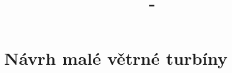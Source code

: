 \documentclass [a4paper,11pt,oneside,notitlepage,openright]{report} %
\author{\Autor}
\title{\Jmeno - \NazevCJ}
\begin{document}

\cleardoublepage

\pagestyle{plain}


\newpage


\cleardoublepage


\cleardoublepage

%

%
\cleardoublepage

\tableofcontents
\cleardoublepage

\cleardoublepage

\cleardoublepage





		
	\part{Návrh malé větrné turbíny}\label{part:navrh}
		
\end{document}
